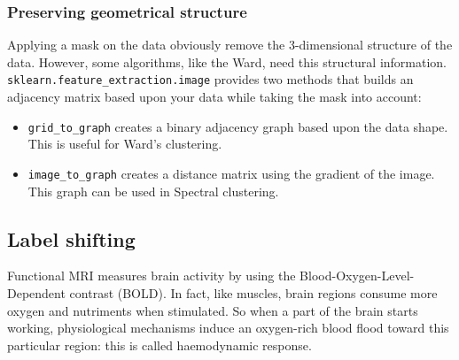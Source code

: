 \documentclass{frontiersSCNS} %
\newcommand{\alex}[1]{\todo[inline, color=green!40]{#1}}
\begin{document}





\subsubsection{Preserving geometrical structure}

Applying a mask on the data obviously remove the 3-dimensional structure of the
data. However, some algorithms, like the Ward, need this structural information.
\verb!sklearn.feature_extraction.image! provides two methods that builds an
adjacency matrix based upon your data while taking the mask into account:
\begin{itemize}
    \item \verb!grid_to_graph! creates a binary adjacency graph based upon the
        data shape. This is useful for Ward's clustering.
    \item \verb!image_to_graph! creates a distance matrix using the gradient of
        the image. This graph can be used in Spectral clustering.
\end{itemize}

\subsection{Label shifting}

Functional MRI measures brain activity by using the Blood-Oxygen-Level-Dependent
contrast (BOLD). In fact, like muscles, brain regions consume more oxygen and
nutriments when stimulated. So when a part of the brain starts working,
physiological mechanisms induce an oxygen-rich blood flood toward this
particular region: this is called haemodynamic response.
\end{document}
